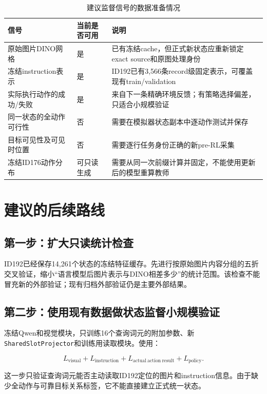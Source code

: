 \documentclass[UTF8,11pt,a4paper,fontset=none]{ctexart}
\newcommand{\code}[1]{\texttt{#1}}
\begin{document}
\begin{table}[htbp]
\centering
\caption{建议监督信号的数据准备情况}
\small
\begin{tabularx}{\textwidth}{p{4.0cm}p{2.4cm}X}
\toprule
\textbf{信号} & \textbf{当前是否可用} & \textbf{说明} \\
\midrule
原始图片DINO网格 & 是 & 已有冻结cache，但正式新状态应重新锁定exact source和原图处理身份 \\
冻结instruction表示 & 是 & ID192已有3,566条record级固定表示，可覆盖现有train/validation \\
实际执行动作的成功/失败 & 是 & 来自下一条精确环境反馈；有策略选择偏差，只适合小规模验证 \\
同一状态的全动作可行性 & 否 & 需要在模拟器状态副本中逐动作测试并保存 \\
目标可见性及可见时位置 & 否 & 需要逐行任务身份正确的新pre-RL采集 \\
冻结ID176动作分布 & 可只读生成 & 需要从同一次前缀计算并固定，不能使用更新后的模型重算教师 \\
\bottomrule
\end{tabularx}
\end{table}

\section{建议的后续路线}

\subsection{第一步：扩大只读统计检查}

ID192已经保存14,261个状态的冻结特征缓存。先进行按原始图片内容分组的五折交叉验证，缩小“语言模型后图片表示与DINO相差多少”的统计范围。该检查不能冒充新的外部验证；现有归档外部验证仍是主要外部结果。

\subsection{第二步：使用现有数据做状态监督小规模验证}

冻结Qwen和视觉模块，只训练16个查询词元的附加参数、新\code{SharedSlotProjector}和训练用读取模块。使用：

\begin{equation}
  L_{\mathrm{visual}}+L_{\mathrm{instruction}}
  +L_{\mathrm{actual\ action\ result}}+L_{\mathrm{policy}}.
\end{equation}

这一步只验证查询词元能否主动读取ID192定位的图片和instruction信息。由于缺少全动作与可靠目标关系标签，它不能直接建立正式统一状态。
\end{document}
